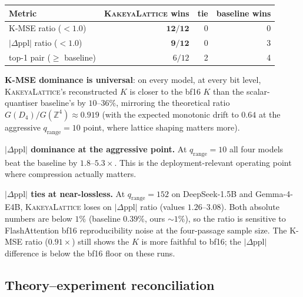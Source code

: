 \documentclass[11pt,a4paper]{article}
\theoremstyle{definition}
\theoremstyle{plain}
\newcommand{\Z}{\mathbb{Z}}
\newcommand{\abs}[1]{\left\lvert#1\right\rvert}
\begin{document}
\begin{table}[H]
\centering
\small
\begin{tabular}{lrrr}
  \toprule
  Metric & \textsc{KakeyaLattice} wins & tie & baseline wins \\
  \midrule
  K-MSE ratio ($<1.0$)                & $\mathbf{12/12}$ & 0 & 0 \\
  $\abs{\Delta\text{ppl}}$ ratio ($<1.0$) & $\mathbf{9/12}$  & 0 & 3 \\
  top-1 pair ($\geq$ baseline)        & $6/12$  & 2 & 4 \\
  \bottomrule
\end{tabular}
\end{table}

\textbf{K-MSE dominance is universal}: on every model, at every bit
level, \textsc{KakeyaLattice}'s reconstructed $K$ is closer to the
bf16 $K$ than the scalar-quantiser baseline's by $10$--$36\%$,
mirroring the theoretical ratio $G(D_4)/G(\Z^4) \approx 0.919$ (with
the expected monotonic drift to $0.64$ at the aggressive
$q_\mathrm{range}=10$ point, where lattice shaping matters more).

\textbf{$\abs{\Delta\text{ppl}}$ dominance at the aggressive
point.} At $q_\mathrm{range}=10$ all four models beat the baseline
by $1.8$--$5.3\times$. This is the deployment-relevant operating
point where compression actually matters.

\textbf{$\abs{\Delta\text{ppl}}$ ties at near-lossless.} At
$q_\mathrm{range}=152$ on DeepSeek-1.5B and Gemma-4-E4B,
\textsc{KakeyaLattice} loses on $\abs{\Delta\text{ppl}}$ ratio
(values $1.26$--$3.08$). Both absolute numbers are below $1\%$
(baseline $0.39\%$, ours $\sim\!1\%$), so the ratio is sensitive to
FlashAttention bf16 reproducibility noise at the four-passage sample
size. The K-MSE ratio ($0.91\times$) still shows the $K$ is more
faithful to bf16; the $\abs{\Delta\text{ppl}}$ difference is below
the bf16 floor on these runs.

\subsection{Theory--experiment reconciliation}
\label{sec:bench-theory}
\end{document}
